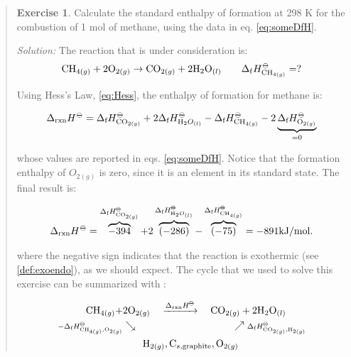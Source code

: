 \documentclass[
]{book}
\theoremstyle{definition}
\theoremstyle{definition}
\theoremstyle{definition}
\newtheorem{exercise}{Exercise}[chapter]
\theoremstyle{remark}
\begin{document}
\begin{quote}
\begin{exercise}
\protect\hypertarget{exr:HessLawEx}{}{\label{exr:HessLawEx} }Calculate the standard enthalpy of formation at 298 K for the combustion of 1 mol of methane, using the data in eq. \eqref{eq:someDfH}.

\emph{Solution:} The reaction that is under consideration is:
\begin{equation}
  \mathrm{CH}_{4(g)} + 2 \mathrm{O}_{2(g)} \rightarrow \mathrm{CO}_{2(g)} + 2 \mathrm{H}_2 \mathrm{O}_{(l)} \qquad \Delta_{\mathrm{f}} H_{\mathrm{CH}_{4(g)}}^{-\kern-6pt{\ominus}\kern-6pt-}= ?
\end{equation}

Using Hess's Law, \eqref{eq:Hess}, the enthalpy of formation for methane is:

\begin{equation}
 \Delta_{\text{rxn}} H^{-\kern-6pt{\ominus}\kern-6pt-}=  \Delta_{\text{f}} H^{-\kern-6pt{\ominus}\kern-6pt-}_{\mathrm{CO}_{2(g)}} + 2 \Delta_{\text{f}} H^{-\kern-6pt{\ominus}\kern-6pt-}_{\mathrm{H}_{2}O_{(l)}} - \Delta_{\text{f}} H^{-\kern-6pt{\ominus}\kern-6pt-}_{\mathrm{CH}_{4(g)}} - 2 \underbrace{\Delta_{\text{f}} H^{-\kern-6pt{\ominus}\kern-6pt-}_{\mathrm{O}_{2(g)}}}_{=0}
\end{equation}

whose values are reported in eqs. \eqref{eq:someDfH}. Notice that the formation enthalpy of \(O_{2(g)}\) is zero, since it is an element in its standard state. The final result is:

\begin{equation}
 \Delta_{\text{rxn}} H^{-\kern-6pt{\ominus}\kern-6pt-}=  \overbrace{-394}^{\Delta_{\text{f}} H^{-\kern-6pt{\ominus}\kern-6pt-}_{\mathrm{CO}_{2(g)}}} +2 \overbrace{(-286)}^{\Delta_{\text{f}} H^{-\kern-6pt{\ominus}\kern-6pt-}_{\mathrm{H}_{2}O_{(l)}}} - \overbrace{(-75)}^{\Delta_{\text{f}} H^{-\kern-6pt{\ominus}\kern-6pt-}_{\mathrm{CH}_{4(g)}}}  = -891 \mathrm{kJ/mol}.
\end{equation}

where the negative sign indicates that the reaction is exothermic (see \ref{def:exoendo}), as we should expect. The cycle that we used to solve this exercise can be summarized with :

\begin{equation}
\begin{aligned}
\mathrm{CH}_{4(g)} + & 2 \mathrm{O}_{2(g)} \quad \xrightarrow{\Delta_{\text{rxn}} H^{-\kern-6pt{\ominus}\kern-6pt-}} \quad \mathrm{CO}_{2(g)} + 2 \mathrm{H}_2 \mathrm{O}_{(l)} \\
  \scriptstyle{-\Delta_{\text{f}} H_{\mathrm{CH}_{4(g)},\mathrm{O}_{2(g)}}^{-\kern-6pt{\ominus}\kern-6pt-}} & \searrow \qquad \qquad \qquad \qquad \qquad \nearrow \; \scriptstyle{\Delta_{\text{f}} H_{\text{CO}_{2(g)},\mathrm{H}_{2(g)}}^{-\kern-6pt{\ominus}\kern-6pt-}}\\
  & \qquad \mathrm{H}_{2(g)}, \mathrm{C}_{s,\text{graphite}}, \mathrm{O}_{2(g)}
\end{aligned}
\end{equation}


\end{exercise}
\end{quote}
\end{document}
